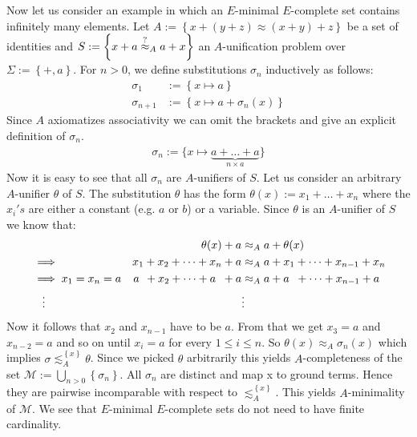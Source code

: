 Now let us consider an example in which an $E$-minimal $E$-complete set contains infinitely many elements. Let $A:=\left\lbrace x+(y+z)\approx (x+y)+z\right\rbrace $ be a set of identities and $S:=\left\lbrace x+a\stackrel{?}{\approx}_A a+x\right\rbrace$ an $A$-unification problem over $\Sigma:=\left\lbrace +,a\right\rbrace$. For $n>0$, we define substitutions $\sigma_n$ inductively as follows:
\begin{align*}
	\sigma_1     & :=\left\lbrace x\mapsto a\right\rbrace             \\
	\sigma_{n+1} & :=\left\lbrace x\mapsto a+\sigma_n(x)\right\rbrace 
\end{align*}
Since $A$ axiomatizes associativity we can omit the brackets and give an explicit definition of $\sigma_n$.
\begin{align*}
	\sigma_n:=\lbrace x\mapsto\underbrace{a+\dots+a}_{n\times a} \rbrace 
\end{align*}
Now it is easy to see that all $\sigma_n$ are $A$-unifiers of $S$.
Let us consider an arbitrary $A$-unifier $\theta$ of $S$. The substitution $\theta$ has the form $\theta(x):=x_1+\dots+x_n$ where the $x_i's$ are either a constant (e.g. $a$ or $b$) or a variable.
Since $\theta$ is an $A$-unifier of $S$ we know that:
\begin{align*}
	  &                          & \theta(x)+a                          & \approx_A a+\theta(x)                          \\
	  & \implies               &  x_1+x_2+\dots+x_n+a   & \approx_A a+x_1+\dots+x_{n-1}+x_n                      \\
	  & \implies x_1=x_n=a     &   a\hphantom{_1}+x_2+\dots+ a \hphantom{_n}+a   & \approx_A a+a\hphantom{_n}+\dots+x_{n-1}+a              \\
	  & \hspace{10pt}\vdots      &                                      & \vdots                                     
\end{align*}
Now it follows that $x_2$ and $x_{n-1}$ have to be $a$. From that we get $x_3=a$ and $x_{n-2}=a$ and so on until $x_i=a$ for every $1\leq i\leq n$.
So $\theta(x)\approx_A\sigma_n(x)$ which implies $\sigma\lesssim^{\left\lbrace x\right\rbrace }_A\theta$.
Since we picked $\theta$ arbitrarily this yields $A$-completeness of the set $\mathcal{M}:=\bigcup_{n>0}\left\lbrace  \sigma_n\right\rbrace $.
All $\sigma_n$ are distinct and map x to ground terms. Hence they are pairwise incomparable with respect to $\lesssim^{\left\lbrace x\right\rbrace }_A$. This yields $A$-minimality of $\mathcal{M}$.
We see that $E$-minimal $E$-complete sets do not need to have finite cardinality.


